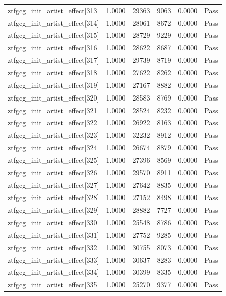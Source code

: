 \begin{table}[htbp]
\begin{tabular}{llrrll}
ztfgcg\_init\_artist\_effect[313] & 1.0000 & 29363 & 9063 & 0.0000 & Pass \\
ztfgcg\_init\_artist\_effect[314] & 1.0000 & 28061 & 8672 & 0.0000 & Pass \\
ztfgcg\_init\_artist\_effect[315] & 1.0000 & 28729 & 9229 & 0.0000 & Pass \\
ztfgcg\_init\_artist\_effect[316] & 1.0000 & 28622 & 8687 & 0.0000 & Pass \\
ztfgcg\_init\_artist\_effect[317] & 1.0000 & 29739 & 8719 & 0.0000 & Pass \\
ztfgcg\_init\_artist\_effect[318] & 1.0000 & 27622 & 8262 & 0.0000 & Pass \\
ztfgcg\_init\_artist\_effect[319] & 1.0000 & 27167 & 8882 & 0.0000 & Pass \\
ztfgcg\_init\_artist\_effect[320] & 1.0000 & 28583 & 8769 & 0.0000 & Pass \\
ztfgcg\_init\_artist\_effect[321] & 1.0000 & 28524 & 8232 & 0.0000 & Pass \\
ztfgcg\_init\_artist\_effect[322] & 1.0000 & 26922 & 8163 & 0.0000 & Pass \\
ztfgcg\_init\_artist\_effect[323] & 1.0000 & 32232 & 8912 & 0.0000 & Pass \\
ztfgcg\_init\_artist\_effect[324] & 1.0000 & 26674 & 8879 & 0.0000 & Pass \\
ztfgcg\_init\_artist\_effect[325] & 1.0000 & 27396 & 8569 & 0.0000 & Pass \\
ztfgcg\_init\_artist\_effect[326] & 1.0000 & 29570 & 8911 & 0.0000 & Pass \\
ztfgcg\_init\_artist\_effect[327] & 1.0000 & 27642 & 8835 & 0.0000 & Pass \\
ztfgcg\_init\_artist\_effect[328] & 1.0000 & 27152 & 8498 & 0.0000 & Pass \\
ztfgcg\_init\_artist\_effect[329] & 1.0000 & 28882 & 7727 & 0.0000 & Pass \\
ztfgcg\_init\_artist\_effect[330] & 1.0000 & 25548 & 8786 & 0.0000 & Pass \\
ztfgcg\_init\_artist\_effect[331] & 1.0000 & 27752 & 9285 & 0.0000 & Pass \\
ztfgcg\_init\_artist\_effect[332] & 1.0000 & 30755 & 8073 & 0.0000 & Pass \\
ztfgcg\_init\_artist\_effect[333] & 1.0000 & 30637 & 8283 & 0.0000 & Pass \\
ztfgcg\_init\_artist\_effect[334] & 1.0000 & 30399 & 8335 & 0.0000 & Pass \\
ztfgcg\_init\_artist\_effect[335] & 1.0000 & 25270 & 9377 & 0.0000 & Pass \\

\end{tabular}
\end{table}
